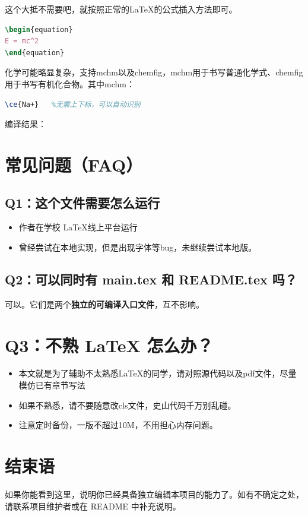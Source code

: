这个大抵不需要吧，就按照正常的\LaTeX 的公式插入方法即可。

\begin{lstlisting}[language=TeX]
\begin{equation}
E = mc^2
\end{equation}
\end{lstlisting}
化学可能略显复杂，支持mchm以及chemfig，mchm用于书写普通化学式、chemfig用于书写有机化合物。其中mchm：

\begin{lstlisting}[language=TeX]
\ce{Na+}   %无需上下标，可以自动识别
\end{lstlisting}
编译结果：

\section{常见问题（FAQ）}

\subsection*{Q1：这个文件需要怎么运行}
\begin{itemize}
  \item 作者在学校 \LaTeX 线上平台运行
  \item 曾经尝试在本地实现，但是出现字体等bug，未继续尝试本地版。
\end{itemize}

\subsection*{Q2：可以同时有 main.tex 和 README.tex 吗？}
可以。它们是两个\textbf{独立的可编译入口文件}，互不影响。

\section*{Q3：不熟 LaTeX 怎么办？}
\begin{itemize}
  \item 本文就是为了辅助不太熟悉\LaTeX 的同学，请对照源代码以及pdf文件，尽量模仿已有章节写法
  \item 如果不熟悉，请不要随意改cls文件，史山代码千万别乱碰。
  \item 注意定时备份，一版不超过10M，不用担心内存问题。
\end{itemize}

\section*{结束语}

如果你能看到这里，说明你已经具备独立编辑本项目的能力了。如有不确定之处，请联系项目维护者或在 README 中补充说明。